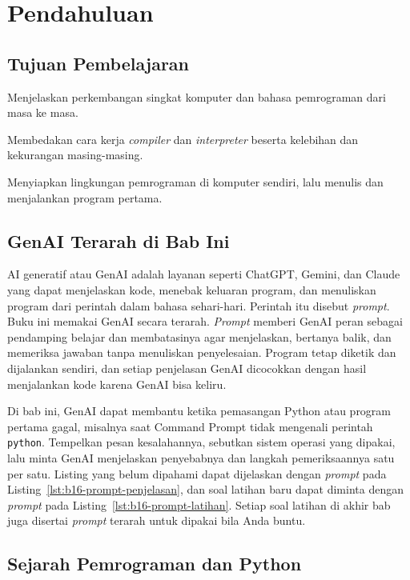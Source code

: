 \chapter{Pendahuluan}

\section*{Tujuan Pembelajaran}
\begin{daftarrapat}
  \item Menjelaskan perkembangan singkat komputer dan bahasa pemrograman dari masa ke masa.
  \item Membedakan cara kerja \textit{compiler} dan \textit{interpreter} beserta kelebihan dan kekurangan masing-masing.
  \item Menyiapkan lingkungan pemrograman di komputer sendiri, lalu menulis dan menjalankan program pertama.
\end{daftarrapat}

\section*{GenAI Terarah di Bab Ini}

AI generatif atau GenAI adalah layanan seperti ChatGPT, Gemini, dan Claude yang dapat menjelaskan kode, menebak keluaran program, dan menuliskan program dari perintah dalam bahasa sehari-hari. Perintah itu disebut \textit{prompt}. Buku ini memakai GenAI secara terarah. \textit{Prompt} memberi GenAI peran sebagai pendamping belajar dan membatasinya agar menjelaskan, bertanya balik, dan memeriksa jawaban tanpa menuliskan penyelesaian. Program tetap diketik dan dijalankan sendiri, dan setiap penjelasan GenAI dicocokkan dengan hasil menjalankan kode karena GenAI bisa keliru.

Di bab ini, GenAI dapat membantu ketika pemasangan Python atau program pertama gagal, misalnya saat Command Prompt tidak mengenali perintah \texttt{python}. Tempelkan pesan kesalahannya, sebutkan sistem operasi yang dipakai, lalu minta GenAI menjelaskan penyebabnya dan langkah pemeriksaannya satu per satu. Listing yang belum dipahami dapat dijelaskan dengan \textit{prompt} pada Listing~\ref{lst:b16-prompt-penjelasan}, dan soal latihan baru dapat diminta dengan \textit{prompt} pada Listing~\ref{lst:b16-prompt-latihan}. Setiap soal latihan di akhir bab juga disertai \textit{prompt} terarah untuk dipakai bila Anda buntu.

\section{Sejarah Pemrograman dan Python}

